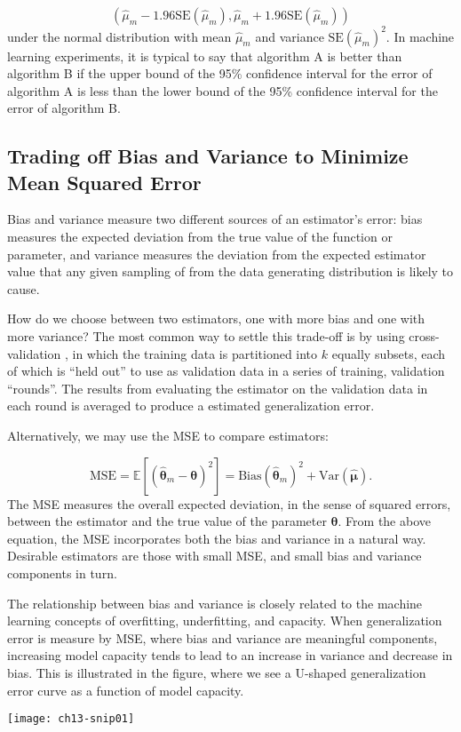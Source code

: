 \begin{equation}
(\hat\mu_m - 1.96 \text{SE}(\hat\mu_m),\hat\mu_m + 1.96 \text{SE}(\hat\mu_m))
\end{equation}
under the normal distribution with mean $\hat\mu_m$ and variance $\text{SE}(\hat\mu_m)^2$. In machine learning experiments, it is typical to say that algorithm A is better than algorithm B if the upper bound of the 95\% confidence interval for the error of algorithm A is less than the lower bound of the 95\% confidence interval for the error of algorithm B.


\subsection{Trading off Bias and Variance to Minimize Mean Squared Error}

Bias and variance measure two different sources of an estimator's error: bias measures the expected deviation from the true value of the function or parameter, and variance measures the deviation from the expected estimator value that any given sampling of from the data generating distribution is likely to cause.

How do we choose between two estimators, one with more bias and one with more variance? The most common way to settle this trade-off is by using cross-validation \cite{wikipediaCrossvalidation2019}, in which the training data is partitioned into $k$ equally subsets, each of which is ``held out'' to use as validation data in a series of training, validation ``rounds''. The results from evaluating the estimator on the validation data in each round is averaged to produce a estimated generalization error.

Alternatively, we may use the \ac{MSE} to compare estimators:

\begin{equation}
\text{MSE} = \mathbb{E}[(\boldsymbol{\hat\theta}_m - \boldsymbol{\theta})^2]
= \text{Bias}(\boldsymbol{\hat\theta}_m)^2 + \text{Var}(\boldsymbol{\hat\mu}).
\end{equation}
The \ac{MSE} measures the overall expected deviation, in the sense of squared errors, between the estimator and the true value of the parameter $\boldsymbol{\theta}$. From the above equation, the \ac{MSE} incorporates both the bias and variance in a natural way. Desirable estimators are those with small \ac{MSE}, and small bias and variance components in turn.

The relationship between bias and variance is closely related to the machine learning concepts of overfitting, underfitting, and capacity. When generalization error is measure by \ac{MSE}, where bias and variance are meaningful components, increasing model capacity tends to lead to an increase in variance and decrease in bias. This is illustrated in the figure, where we see a U-shaped generalization error curve as a function of model capacity.
\begin{marginfigure}
\texttt{[image: ch13-snip01]}
\end{marginfigure}



